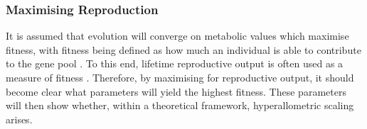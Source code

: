 \documentclass[a4paper, 11pt, hidelinks]{article} %
\begin{document}
	\subsubsection{Maximising Reproduction}
	It is assumed that evolution will converge on metabolic values which maximise fitness, with fitness being defined as how much an individual is able to contribute to the gene pool \parencite{Stearns2000, Speakman2008}.  %
	To this end, lifetime reproductive output is often used as a measure of fitness \parencite{Charnov1991, Brown1993, Stearns2000, Charnov2001,  Charnov2007,  Speakman2008, Tsoukali2016,  Audzijonyte2018}.  Therefore, by maximising for reproductive output, it should become clear what parameters will yield the highest fitness.  These parameters will then show whether, within a theoretical framework, hyperallometric scaling arises.
	
\end{document}
